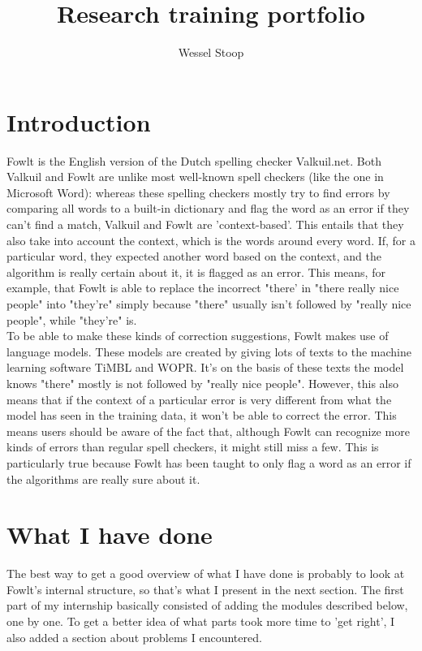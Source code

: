 \documentclass[12pt]{article}
\title{Research training portfolio}
\author{Wessel Stoop}
\let\stdsection\section
\renewcommand\section{\newpage\stdsection}
\begin{document}
\maketitle

\section{Introduction}
Fowlt is the English version of the Dutch spelling checker Valkuil.net. Both Valkuil and Fowlt are unlike most well-known spell checkers (like the one in Microsoft Word): whereas these spelling checkers mostly try to find errors by comparing all words to a built-in dictionary and flag the word as an error if they can't find a match, Valkuil and Fowlt are 'context-based'. This entails that they also take into account the context, which is the words around every word. If, for a particular word, they expected another word based on the context, and the algorithm is really certain about it, it is flagged as an error. This means, for example, that Fowlt is able to replace the incorrect "there' in "there really nice people" into "they're" simply because "there" usually isn't followed by "really nice people", while "they're" is. 
\\\indent
To be able to make these kinds of correction suggestions, Fowlt makes use of language models. These models are created by giving lots of texts to the machine learning software TiMBL and WOPR. It's on the basis of these texts the model knows "there" mostly is not followed by "really nice people". However, this also means that if the context of a particular error is very different from what the model has seen in the training data, it won't be able to correct the error. This means users should be aware of the fact that, although Fowlt can recognize more kinds of errors than regular spell checkers, it might still miss a few. This is particularly true because Fowlt has been taught to only flag a word as an error if the algorithms are really sure about it.

\section{What I have done}
The best way to get a good overview of what I have done is probably to look at Fowlt's internal structure, so that's what I present in the next section. The first part of my internship basically consisted of adding the modules described below, one by one. To get a better idea of what parts took more time to 'get right', I also added a section about problems I encountered.
\end{document}
